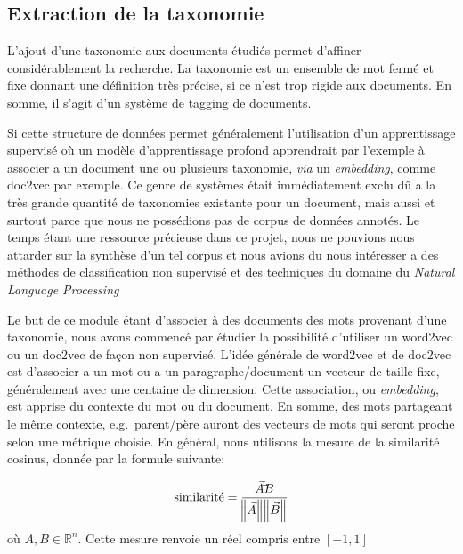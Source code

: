 
\subsection{Extraction de la taxonomie}
L'ajout d'une taxonomie aux documents étudiés permet d'affiner considérablement la recherche.
La taxonomie est un ensemble de mot fermé et fixe donnant une définition très précise, si ce n'est trop rigide aux documents.
En somme, il s'agit d'un système de tagging de documents. 

Si cette structure de données permet généralement l'utilisation d'un apprentissage supervisé où un modèle d'apprentissage profond apprendrait par l'exemple à associer a un document une ou plusieurs taxonomie, \textit{via} un \textit{embedding}, comme doc2vec\cite{doc2vec} par exemple.
Ce genre de systèmes était immédiatement exclu dû a la très grande quantité de taxonomies existante pour un document, mais aussi et surtout parce que nous ne possédions pas de corpus de données annotés.
Le temps étant une ressource précieuse dans ce projet, nous ne pouvions nous attarder sur la synthèse d'un tel corpus et nous avions du nous intéresser a des méthodes de classification non supervisé et des techniques du domaine du \textit{Natural Language Processing}

Le but de ce module étant d'associer à des documents des mots provenant d'une taxonomie, nous avons commencé par étudier la possibilité d'utiliser un word2vec\cite{word2vec} ou un doc2vec de façon non supervisé.
L'idée générale de word2vec et de doc2vec est d'associer a un mot ou a un paragraphe/document un vecteur de taille fixe, généralement avec une centaine de dimension. Cette association, ou \textit{embedding}, est apprise du contexte du mot ou du document.
En somme, des mots partageant le même contexte, e.g.\ parent/père auront des vecteurs de mots qui seront proche selon une métrique choisie.
En général, nous utilisons la mesure de la similarité cosinus, donnée par la formule suivante:

\begin{equation}
	\text{similarité} = \frac{\vec{A} \dot \vec{B}}{\norm{\vec{A}}\norm{\vec{B}}}
\end{equation}
où $A, B  \in \mathbb{R}^n$. Cette mesure renvoie un réel compris entre $[-1, 1]$

